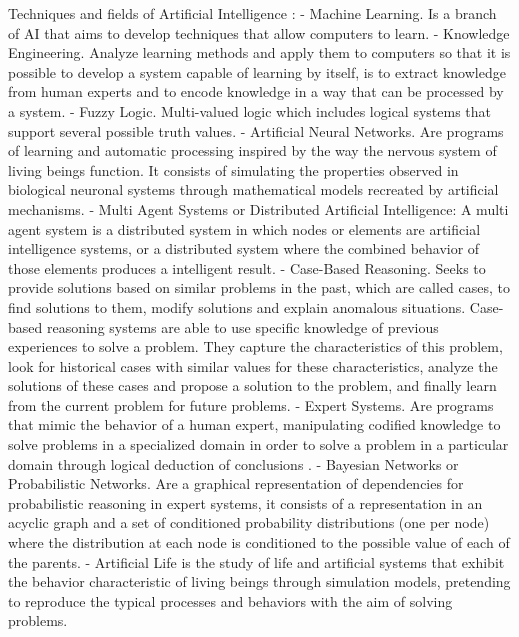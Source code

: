 \documentclass[letterpaper, 10 pt, conference]{ieeeconf}  %
\begin{document}
Techniques and fields of Artificial Intelligence \cite{bustos2005inteligencia}:
- Machine Learning. Is a branch of AI that aims to develop techniques that allow computers to learn. 
- Knowledge Engineering. Analyze learning methods and apply them to computers so that it is possible to develop a system capable of learning by itself, is to extract knowledge from human experts and to encode knowledge in a way that can be processed by a system.
- Fuzzy Logic. Multi-valued logic which includes logical systems that support several possible truth values. 
- Artificial Neural Networks. Are programs of learning and automatic processing inspired by the way the nervous system of living beings function. It consists of simulating the properties observed in biological neuronal systems through mathematical models recreated by artificial mechanisms.
- Multi Agent Systems or Distributed Artificial Intelligence: A multi agent system is a distributed system in which nodes or elements are artificial intelligence systems, or a distributed system where the combined behavior of those elements produces a intelligent result.
- Case-Based Reasoning. Seeks to provide solutions based on similar problems in the past, which are called cases, to find solutions to them, modify solutions and explain anomalous situations. Case-based reasoning systems are able to use specific knowledge of previous experiences to solve a problem. They capture the characteristics of this problem, look for historical cases with similar values for these characteristics, analyze the solutions of these cases and propose a solution to the problem, and finally learn from the current problem for future problems.
- Expert Systems. Are programs that mimic the behavior of a human expert, manipulating codified knowledge to solve problems in a specialized domain in order to solve a problem in a particular domain through logical deduction of conclusions .
- Bayesian Networks or Probabilistic Networks. Are a graphical representation of dependencies for probabilistic reasoning in expert systems, it consists of a representation in an acyclic graph and a set of conditioned probability distributions (one per node) where the distribution at each node is conditioned to the possible value of each of the parents.
- Artificial Life is the study of life and artificial systems that exhibit the behavior characteristic of living beings through simulation models, pretending to reproduce the typical processes and behaviors with the aim of solving problems.
\end{document}
